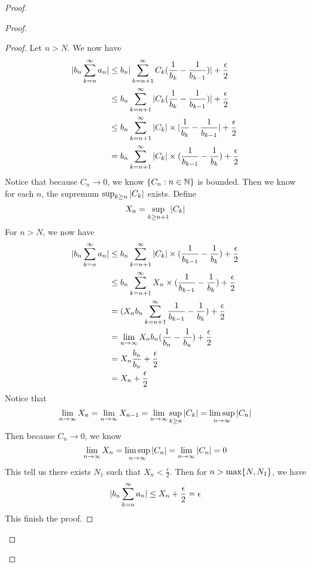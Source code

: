 \documentclass{report}
\begin{document}
\begin{proof}
\begin{proof}
\begin{proof}
Let $n>N$. We now have
 \begin{align}
   |b_n\sum_{k=n}^\infty a_n|&\leq b_n|\sum_{k=n+1}^\infty C_k(\frac{1}{b_k}-\frac{1}{b_{k-1}})|+\frac{\epsilon}{2}\\
&\leq b_n\sum_{k=n+1}^\infty |C_k(\frac{1}{b_k}-\frac{1}{b_{k-1}})|+\frac{\epsilon}{2}\\
&\leq b_n\sum_{k=n+1}^\infty |C_k| \times|\frac{1}{b_k}-\frac{1}{b_{k-1}}|+\frac{\epsilon}{2}\\
&= b_n\sum_{k=n+1}^\infty |C_k|\times (\frac{1}{b_{k-1}}-\frac{1}{b_k})+\frac{\epsilon}{2}
\end{align}
Notice that because $C_n\to 0$, we know  $\{ C_n:n\in\mathbb{N} \}$ is bounded. Then we know for each $n$, the supremum  $\sup_{k\geq n} |C_k|$ exists. Define
\begin{equation}
X_n=\sup_{k\geq n+1}|C_k|
\end{equation}
For $n>N$, we now have
 \begin{align}
   |b_n\sum_{k=n}^\infty a_n|&\leq b_n\sum_{k=n+1}^\infty |C_k|\times (\frac{1}{b_{k-1}}-\frac{1}{b_k})+\frac{\epsilon}{2}\\
                                  &\leq b_n\sum_{k=n+1}^\infty X_n \times (\frac{1}{b_{k-1}}-\frac{1}{b_k})+\frac{\epsilon}{2}\\
   &=(X_nb_n\sum_{k=n+1}^\infty \frac{1}{b_{k-1}}-\frac{1}{b_k}) +\frac{\epsilon}{2}\\
   &=\lim_{u\to\infty} X_nb_n (\frac{1}{b_n}-\frac{1}{b_u})+\frac{\epsilon}{2}\\
   &=X_n \frac{b_n}{b_n}+\frac{\epsilon}{2}\\
   &=X_n+\frac{\epsilon}{2}
\end{align}
Notice that 
\begin{equation}
\lim_{n\to\infty}X_n=\lim_{n\to\infty}X_{n-1}=\lim_{n\to\infty}\sup_{k\geq n}|C_k|=\limsup_{n\to\infty} |C_n|
\end{equation}
Then because $C_n\to 0$, we know 
 \begin{equation}
\lim_{n\to\infty}X_n=\limsup_{n\to\infty} |C_n|=\lim_{n\to\infty}|C_n|=0
\end{equation}
This tell us there exists $N_1$ such that  $X_n<\frac{\epsilon}{2}$. Then for $n>\max \{ N,N_1 \}$, we have
\begin{equation}
|b_n\sum_{k=n}^\infty a_n|\leq X_n+\frac{\epsilon}{2}=\epsilon 
\end{equation}
This finish the proof. 
\end{proof}

\end{proof}
\end{proof}
\end{document}
